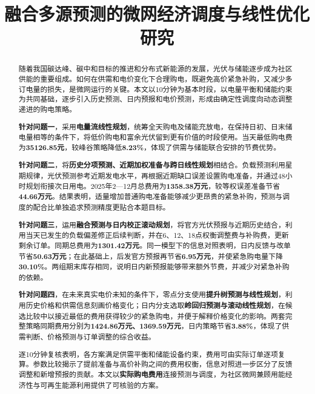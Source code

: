 \title{融合多源预测的微网经济调度与线性优化研究}
\date{}
\maketitle
\begingroup
{}
\begin{abstract}
\noindent\hspace*{2em}随着我国碳达峰、碳中和目标的推进和分布式新能源的发展，光伏与储能逐步成为社区供能的重要组成。如何在供需和电价变化下合理购电，既避免高价紧急补购，又减少多订电量的损失，是微网运行的关键。本文以10分钟为基本时段，以电量平衡和储能约束为共同基础，逐步引入历史预测、日内预报和电价预测，形成由确定性调度向动态调整递进的购电策略。

\textbf{针对问题一}，采用\textbf{电量流线性规划}，统筹全天购电及储能充放电，在保持日初、日末储电量相等的条件下，将低价购电和富余光伏留到更有价值的时段使用。当天最低购电费为\textbf{35126.85元}，较峰谷策略降低\textbf{8.23\%}，体现了供需与储能联合安排的节费优势。

\textbf{针对问题二}，将\textbf{历史分项预测、近期加权准备与跨日线性规划}相结合。负载预测利用星期规律，光伏预测参考近期发电水平，再根据近期缺口误差设置购电准备，并通过48小时规划衔接次日用电。2025年2—12月总费用为\textbf{1358.38万元}，较等权误差准备节省\textbf{44.66万元}。结果表明，适量增加普通购电准备能够减少更昂贵的紧急补购，预测与调度的配合比单独追求预测精度更贴合本题目标。

\textbf{针对问题三}，运用\textbf{融合预测与日内校正滚动规划}，将官方光伏预报与近期历史结合，利用当天已发生的负载偏差修正后续判断，并在6、12、18点权衡调整费与补购费，更新剩余订单。同期总费用为\textbf{1301.42万元}。同一模型下的信息对照表明，日内反馈与改单节省\textbf{50.63万元}；在此基础上，后发官方预报再节省\textbf{6.95万元}，并使紧急购电量下降\textbf{30.10\%}。两组期末库存相同，说明日内新预报能够带来额外节费，并减少对紧急补购的依赖。

\textbf{针对问题四}，在未来真实电价未知的条件下，零点分支使用\textbf{提升树预测与线性规划}，利用历史价格和供需信息刻画价格变化；日内分支选取\textbf{岭回归预测与滚动线性规划}，在候选比较中以接近最低的费用获得较少的紧急购电，并便于解释价格变化的影响。两套完整策略同期费用分别为\textbf{1424.86万元、1369.59万元}，日内策略节省\textbf{3.88\%}，体现了供需判断、价格预测与订单调整的综合收益。

逐10分钟复核表明，各方案满足供需平衡和储能设备约束，费用可由实际订单逐项复算。参数比较揭示了提前准备与高价补购之间的费用权衡，信息对照进一步区分了反馈调整和新增预报的贡献。本文以\textbf{实际购电费用}连接预测与调度，为社区微网兼顾用能经济性与可再生能源利用提供了可核验的方案。
\end{abstract}
\par
\endgroup
